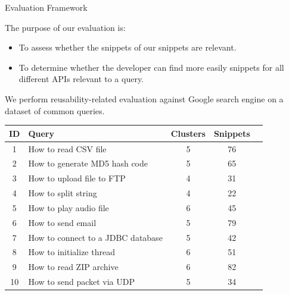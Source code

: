 \documentclass[compress]{beamer}
\begin{document}
\begin{frame}{Evaluation Framework}

The purpose of our evaluation is:
\begin{itemize}

	\item To assess whether the snippets of our snippets are relevant.
	\item To determine whether the developer can find more easily snippets for all different APIs relevant to a query.
	
\end{itemize}


We perform reusability-related evaluation against Google search engine on a dataset of common queries.

\begin{table}
\centering
\tiny
\begin{tabular}{ c l c c c }
\hline
\textbf{ID} & \textbf{Query} & \textbf{Clusters} & \textbf{Snippets}\\
\hline
1 & How to read CSV file & 5 & 76\\
2 & How to generate MD5 hash code & 5 & 65\\
3 & How to upload file to FTP & 4 & 31\\
4 & How to split string & 4 & 22\\
5 & How to play audio file & 6 & 45\\
6 & How to send email & 5 & 79\\
7 & How to connect to a JDBC database & 5 & 42\\
8 & How to initialize thread & 6 & 51\\
9 & How to read ZIP archive & 6 & 82\\
10& How to send packet via UDP & 5 & 34\\
\hline
\end{tabular}
\end{table}

\end{frame}

\end{document}
